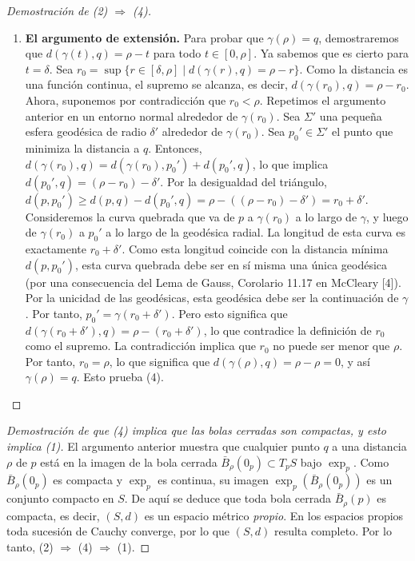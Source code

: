 \documentclass[12pt, a4paper]{report}
\theoremstyle{miestilo}
\theoremstyle{midefinicion}
\begin{document}
\begin{proof}[Demostración de (2) $\Rightarrow$ (4)]
\begin{enumerate}
    \item \textbf{El argumento de extensión.} Para probar que $\gamma(\rho)=q$, demostraremos que $d(\gamma(t), q) = \rho - t$ para todo $t \in [0, \rho]$. Ya sabemos que es cierto para $t=\delta$. Sea $r_0 = \sup \{ r \in [\delta, \rho] \mid d(\gamma(r), q) = \rho - r \}$. Como la distancia es una función continua, el supremo se alcanza, es decir, $d(\gamma(r_0), q) = \rho - r_0$.
    Ahora, suponemos por contradicción que $r_0 < \rho$. Repetimos el argumento anterior en un entorno normal alrededor de $\gamma(r_0)$. Sea $\Sigma'$ una pequeña esfera geodésica de radio $\delta'$ alrededor de $\gamma(r_0)$. Sea $p_0' \in \Sigma'$ el punto que minimiza la distancia a $q$. Entonces, $d(\gamma(r_0), q) = d(\gamma(r_0), p_0') + d(p_0', q)$, lo que implica $d(p_0', q) = (\rho - r_0) - \delta'$.
    Por la desigualdad del triángulo, $d(p, p_0') \ge d(p,q) - d(p_0',q) = \rho - ((\rho - r_0) - \delta') = r_0 + \delta'$.
    Consideremos la curva quebrada que va de $p$ a $\gamma(r_0)$ a lo largo de $\gamma$, y luego de $\gamma(r_0)$ a $p_0'$ a lo largo de la geodésica radial. La longitud de esta curva es exactamente $r_0 + \delta'$. Como esta longitud coincide con la distancia mínima $d(p,p_0')$, esta curva quebrada debe ser en sí misma una única geodésica (por una consecuencia del Lema de Gauss, Corolario 11.17 en McCleary [4]).
    Por la unicidad de las geodésicas, esta geodésica debe ser la continuación de $\gamma$. Por tanto, $p_0' = \gamma(r_0 + \delta')$. Pero esto significa que $d(\gamma(r_0+\delta'), q) = \rho - (r_0+\delta')$, lo que contradice la definición de $r_0$ como el supremo.
    La contradicción implica que $r_0$ no puede ser menor que $\rho$. Por tanto, $r_0 = \rho$, lo que significa que $d(\gamma(\rho), q) = \rho - \rho = 0$, y así $\gamma(\rho)=q$. Esto prueba (4).
\end{enumerate}
\end{proof}

\begin{proof}[Demostración de que (4) implica que las bolas cerradas son compactas, y esto implica (1)]
El argumento anterior muestra que cualquier punto $q$ a una distancia $\rho$ de $p$ está en la imagen de la bola cerrada $\bar{B}_\rho(0_p) \subset T_pS$ bajo $\exp_p$. Como $\bar{B}_\rho(0_p)$ es compacta y $\exp_p$ es continua, su imagen $\exp_p(\bar{B}_\rho(0_p))$ es un conjunto compacto en $S$. De aquí se deduce que toda bola cerrada $\bar{B}_\rho(p)$ es compacta, es decir, $(S,d)$ es un espacio métrico \emph{propio}. En los espacios propios toda sucesión de Cauchy converge, por lo que $(S,d)$ resulta completo. Por lo tanto, (2) $\Rightarrow$ (4) $\Rightarrow$ (1).
\end{proof}
\end{document}
